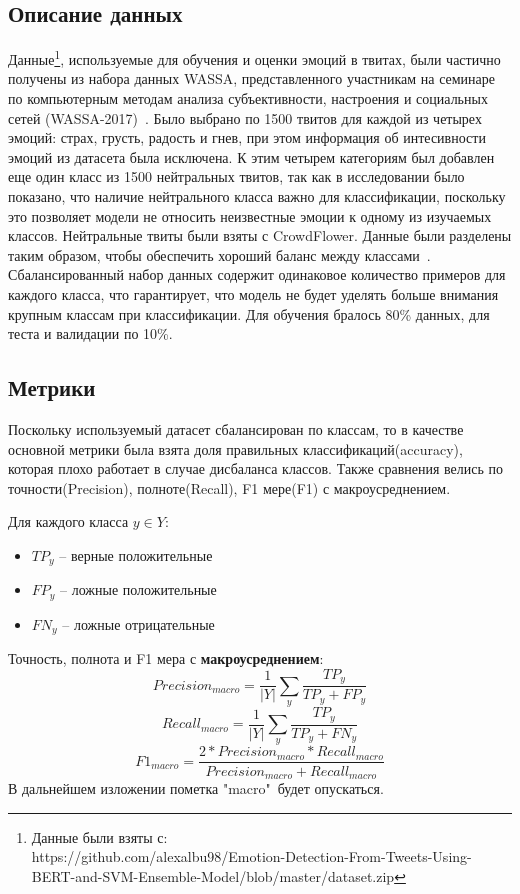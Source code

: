 \documentclass{article}
\begin{document}
\subsection{Описание данных}
Данные\footnote{Данные были взяты с: \\ https://github.com/alexalbu98/Emotion-Detection-From-Tweets-Using-BERT-and-SVM-Ensemble-Model/blob/master/dataset.zip}, используемые для обучения и оценки эмоций в твитах, были частично получены из набора данных WASSA, представленного участникам на семинаре по компьютерным методам анализа субъективности, настроения и социальных сетей (WASSA-2017)~\cite{wassa}. Было выбрано по 1500 твитов для каждой из четырех эмоций: страх, грусть, радость и гнев, при этом информация об интесивности эмоций из датасета была исключена. К этим четырем категориям был добавлен еще один класс из 1500 нейтральных твитов, так как в исследовании\cite{koppel} было показано, что наличие нейтрального класса важно для классификации, поскольку это позволяет модели не относить неизвестные эмоции к одному из изучаемых классов. Нейтральные твиты были взяты с CrowdFlower. 
Данные были разделены таким образом, чтобы обеспечить хороший баланс между классами~\cite{borovicka}. Сбалансированный набор данных содержит одинаковое количество примеров для каждого класса, что гарантирует, что модель не будет уделять больше внимания крупным классам при классификации.
Для обучения бралось 80\% данных, для теста и валидации по 10\%.

\subsection{Метрики}
Поскольку используемый датасет сбалансирован по классам, то в качестве основной метрики была взята доля правильных классификаций(accuracy), которая плохо работает в случае дисбаланса классов. Также сравнения велись по точности(Precision), полноте(Recall), F1 мере(F1) с макроусреднением. 

Для каждого класса $y \in Y$:
\begin{itemize}
    \item $TP_y$ -- верные положительные
    \item $FP_y$ -- ложные положительные
    \item $FN_y$ -- ложные отрицательные
\end{itemize}
Точность, полнота и F1 мера с {\bfseries макроусреднением}:
            $$ 
                Precision_{macro} = \frac{1}{|Y|}\sum_{y}\frac{TP_y}{TP_y + FP_y}
            $$
            $$ 
                Recall_{macro} = \frac{1}{|Y|}\sum_{y}\frac{TP_y}{TP_y + FN_y}
            $$
            $$
                F1_{macro} = \frac{2 * Precision_{macro} * Recall_{macro}}
                                  {Precision_{macro} + Recall_{macro}}
            $$
В дальнейшем изложении пометка "macro"\ будет опускаться.
\end{document}
